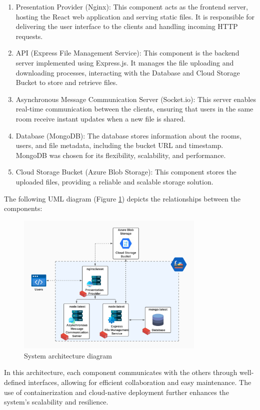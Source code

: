 \documentclass[a4paper,fleqn]{cas-dc}
\begin{document}
\begin{enumerate}
    \item Presentation Provider (Nginx): This component acts as the frontend server, hosting the React web application and serving static files. It is responsible for delivering the user interface to the clients and handling incoming HTTP requests.
    \item API (Express File Management Service): This component is the backend server implemented using Express.js. It manages the file uploading and downloading processes, interacting with the Database and Cloud Storage Bucket to store and retrieve files.
    \item Asynchronous Message Communication Server (Socket.io): This server enables real-time communication between the clients, ensuring that users in the same room receive instant updates when a new file is shared.
    \item Database (MongoDB): The database stores information about the rooms, users, and file metadata, including the bucket URL and timestamp. MongoDB was chosen for its flexibility, scalability, and performance.
    \item Cloud Storage Bucket (Azure Blob Storage): This component stores the uploaded files, providing a reliable and scalable storage solution.
\end{enumerate}

The following UML diagram (Figure \ref{fig:architecture}) depicts the relationships between the components:

\begin{figure}[h]
    \centering
    \includegraphics[width=9cm]{architecture.pdf}
    \caption{System architecture diagram}
    \label{fig:architecture}
\end{figure}

In this architecture, each component communicates with the others through well-defined interfaces, allowing for efficient collaboration and easy maintenance. The use of containerization and cloud-native deployment further enhances the system's scalability and resilience.
\end{document}
